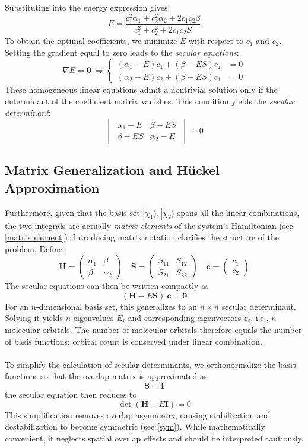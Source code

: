 	Substituting into the energy expression gives: 
	\[E = \frac{c_1^2\alpha_1+c_2^2\alpha_2+2c_1c_2\beta}{c_1^2+c_2^2+2c_1c_2S}\]
	To obtain the optimal coefficients, 
	we minimize $E$ with respect to $c_1$ and $c_2$. 
	Setting the gradient equal to zero leads to the \emph{secular equations}:
	\[
	\nabla E = \mathbf{0} \ 
	\Rightarrow 
	\begin{cases}
	(\alpha_1-E)c_1+(\beta-ES)c_2&= 0 \\
	(\alpha_2-E)c_2+(\beta-ES)c_1&= 0 
	\end{cases}
	\]
	These homogeneous linear equations admit a nontrivial solution 
	only if the determinant of the coefficient matrix vanishes. 
	This condition yields the \emph{secular determinant}:
	\[\begin{vmatrix}
	\ \alpha_1-E & \beta-ES\  \\ \ \beta-ES & \alpha_2-E\ 
	\end{vmatrix}=0\]
	
\subsection{Matrix Generalization and H\"uckel Approximation}
	
	Furthermore, given that the basis set ${|\chi_1\rangle, |\chi_2\rangle}$ spans all the linear combinations, 
	the two integrals are actually \emph{matrix elements} of the system's Hamiltonian (see \ref{matrix element}).
	Introducing matrix notation clarifies the structure of the problem. Define:
	\[
	\mathbf{H} = \begin{pmatrix} \alpha_1 & \beta \\ \beta & \alpha_2 \end{pmatrix} \quad
	\mathbf{S} = \begin{pmatrix} S_{11} & S_{12} \\ S_{21} & S_{22} \end{pmatrix} \quad
	\mathbf{c} = \begin{pmatrix} c_1 \\ c_2 \end{pmatrix} 
	\]
	The secular equations can then be written compactly as
	\[\boxed{(\mathbf{H} - E\mathbf{S})\ \mathbf{c} = \mathbf{0}}\]
	For an $n$-dimensional basis set, 
	this generalizes to an $n\times n$ secular determinant. 
	Solving it yields $n$ eigenvalues $E_i$ and corresponding eigenvectors $\mathbf{c}_i$, 
	i.e., $n$ molecular orbitals. 
	The number of molecular orbitals therefore equals the number of basis functions: 
	orbital count is conserved under linear combination.\\ \\
	To simplify the calculation of secular determinants, 
	we orthonormalize the basis functions so that the overlap matrix is approximated as
	\[
	\mathbf{S} = \mathbf{I}
	\]
	the secular equation then reduces to
	\[
	\det(\mathbf{H} - E\mathbf{I}) = 0
	\]
	This simplification removes overlap asymmetry, causing stabilization and destabilization to become symmetric (see \ref{sym}).\label{Huckel}
	While mathematically convenient, it neglects spatial overlap effects and should be interpreted cautiously.

